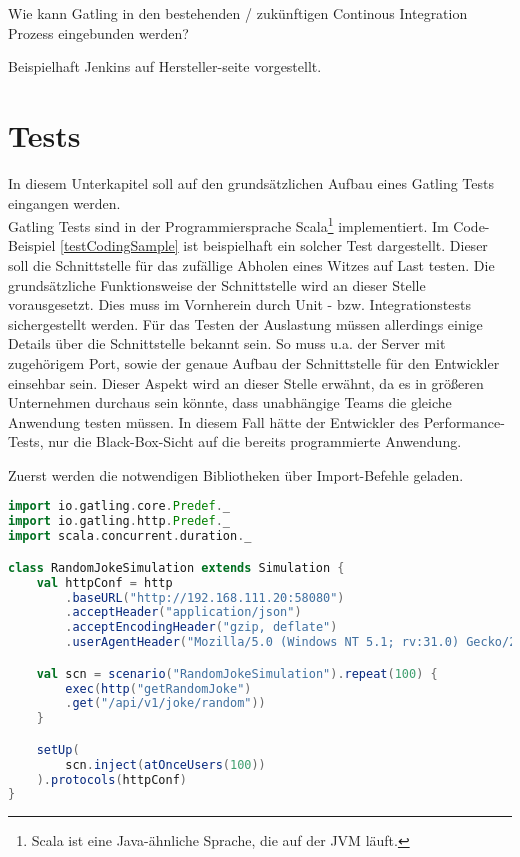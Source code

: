 Wie kann Gatling in den bestehenden / zukünftigen Continous Integration Prozess eingebunden werden?

Beispielhaft Jenkins auf Hersteller-seite vorgestellt.


\section{Tests}
In diesem Unterkapitel soll auf den grundsätzlichen Aufbau eines Gatling Tests eingangen werden.\\
Gatling Tests sind in der Programmiersprache Scala\footnote{{} Scala ist eine Java-ähnliche Sprache, die auf der \ac{JVM} läuft.} implementiert.
Im Code-Beispiel \ref{testCodingSample} ist beispielhaft ein solcher Test dargestellt. Dieser soll die Schnittstelle für das zufällige Abholen eines Witzes auf Last testen. Die grundsätzliche Funktionsweise der Schnittstelle wird an dieser Stelle vorausgesetzt. Dies muss im Vornherein durch Unit - bzw. Integrationstests sichergestellt werden. Für das Testen der Auslastung müssen allerdings einige Details über die Schnittstelle bekannt sein. So muss u.a. der Server mit zugehörigem Port, sowie der genaue Aufbau der Schnittstelle für den Entwickler einsehbar sein. Dieser Aspekt wird an dieser Stelle erwähnt, da es in größeren Unternehmen durchaus sein könnte, dass unabhängige Teams die gleiche Anwendung testen müssen. In diesem Fall hätte der Entwickler des Performance-Tests, nur die Black-Box-Sicht auf die bereits programmierte Anwendung. 

Zuerst werden die notwendigen Bibliotheken über \glqq Import-Befehle\grqq{} geladen.  

\begin{minipage}{\linewidth}
\begin{lstlisting}[frame=single,caption=Testabfrage auf Schnittstelle, label=testCodingSample, language=Scala]
import io.gatling.core.Predef._
import io.gatling.http.Predef._
import scala.concurrent.duration._

class RandomJokeSimulation extends Simulation {
    val httpConf = http
        .baseURL("http://192.168.111.20:58080")
        .acceptHeader("application/json")
        .acceptEncodingHeader("gzip, deflate")
        .userAgentHeader("Mozilla/5.0 (Windows NT 5.1; rv:31.0) Gecko/20100101 Firefox/31.0")

    val scn = scenario("RandomJokeSimulation").repeat(100) {
        exec(http("getRandomJoke")
        .get("/api/v1/joke/random"))
    }    

    setUp(
        scn.inject(atOnceUsers(100))
    ).protocols(httpConf)
}
\end{lstlisting}
\end{minipage}



